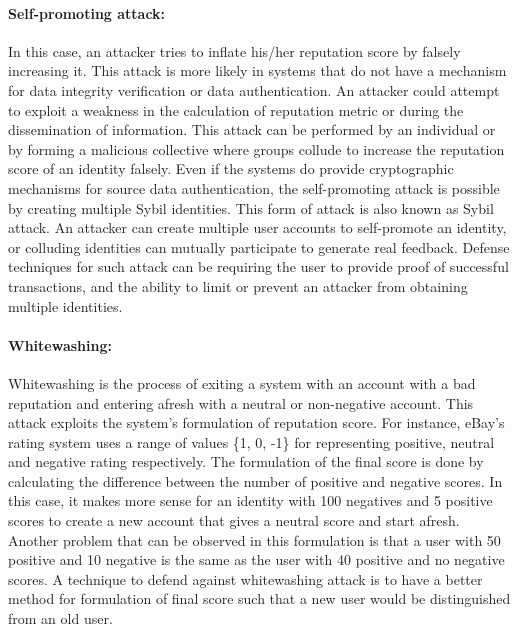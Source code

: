 \paragraph{Self-promoting attack:} In this case, an attacker tries to inflate
his/her reputation score by falsely increasing it. This attack is more likely
in systems that do not have a mechanism for data integrity verification or data
authentication. An attacker could attempt to exploit a weakness in the
calculation of reputation metric or during the dissemination of information.
This attack can be performed by an individual or by forming a malicious
collective where groups collude to increase the reputation score of an identity
falsely. Even if the systems do provide cryptographic mechanisms for source
data authentication, the self-promoting attack is possible by creating multiple
Sybil identities. This form of attack is also known as Sybil attack. An
attacker can create multiple user accounts to self-promote an identity, or
colluding identities can mutually participate to generate real feedback.
Defense techniques for such attack can be requiring the user to provide proof
of successful transactions, and the ability to limit or prevent an attacker
from obtaining multiple identities. 
\paragraph{Whitewashing:} Whitewashing is the process of exiting a system with
an account with a bad reputation and entering afresh with a neutral or
non-negative account. This attack exploits the system's formulation of
reputation score. For instance, eBay's rating system uses a range of values
\{1, 0, -1\} for representing positive, neutral and negative rating
respectively. The formulation of the final score is done by calculating the
difference between the number of positive and negative scores. In this case, it
makes more sense for an identity with 100 negatives and 5 positive scores to
create a new account that gives a neutral score and start afresh. Another
problem that can be observed in this formulation is that a user with 50
positive and 10 negative is the same as the user with 40 positive and no
negative scores. A technique to defend against whitewashing attack is to have a
better method for formulation of final score such that a new user would be
distinguished from an old user. 
